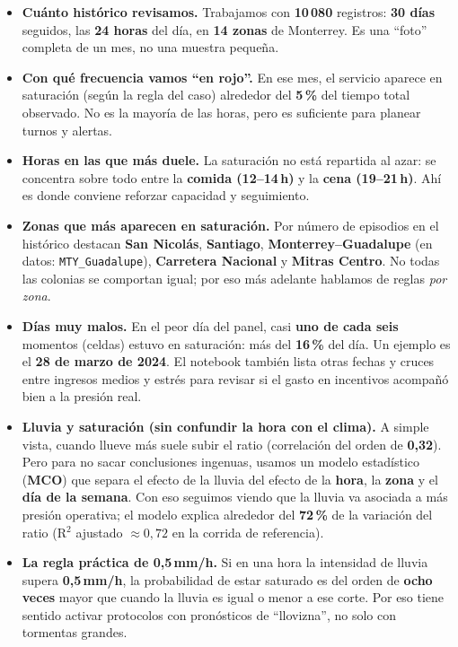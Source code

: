 \documentclass[11pt,a4paper]{article}
\begin{document}
\begin{itemize}
  \item \textbf{Cuánto histórico revisamos.} Trabajamos con \textbf{10\,080} registros: \textbf{30 días} seguidos, las \textbf{24 horas} del día, en \textbf{14 zonas} de Monterrey. Es una ``foto'' completa de un mes, no una muestra pequeña.

  \item \textbf{Con qué frecuencia vamos ``en rojo''.} En ese mes, el servicio aparece en saturación (según la regla del caso) alrededor del \textbf{5\,\%} del tiempo total observado. No es la mayoría de las horas, pero es suficiente para planear turnos y alertas.

  \item \textbf{Horas en las que más duele.} La saturación no está repartida al azar: se concentra sobre todo entre la \textbf{comida (12--14\,h)} y la \textbf{cena (19--21\,h)}. Ahí es donde conviene reforzar capacidad y seguimiento.

  \item \textbf{Zonas que más aparecen en saturación.} Por número de episodios en el histórico destacan \textbf{San Nicolás}, \textbf{Santiago}, \textbf{Monterrey--Guadalupe} (en datos: \texttt{MTY\_Guadalupe}), \textbf{Carretera Nacional} y \textbf{Mitras Centro}. No todas las colonias se comportan igual; por eso más adelante hablamos de reglas \emph{por zona}.

  \item \textbf{Días muy malos.} En el peor día del panel, casi \textbf{uno de cada seis} momentos (celdas) estuvo en saturación: más del \textbf{16\,\%} del día. Un ejemplo es el \textbf{28 de marzo de 2024}. El notebook también lista otras fechas y cruces entre ingresos medios y estrés para revisar si el gasto en incentivos acompañó bien a la presión real.

  \item \textbf{Lluvia y saturación (sin confundir la hora con el clima).} A simple vista, cuando llueve más suele subir el ratio (correlación del orden de \textbf{0{,}32}). Pero para no sacar conclusiones ingenuas, usamos un modelo estadístico (\textbf{MCO}) que separa el efecto de la lluvia del efecto de la \textbf{hora}, la \textbf{zona} y el \textbf{día de la semana}. Con eso seguimos viendo que la lluvia va asociada a más presión operativa; el modelo explica alrededor del \textbf{72\,\%} de la variación del ratio (R$^2$ ajustado $\approx 0{,}72$ en la corrida de referencia).

  \item \textbf{La regla práctica de 0{,}5\,mm/h.} Si en una hora la intensidad de lluvia supera \textbf{0{,}5\,mm/h}, la probabilidad de estar saturado es del orden de \textbf{ocho veces} mayor que cuando la lluvia es igual o menor a ese corte. Por eso tiene sentido activar protocolos con pronósticos de ``llovizna'', no solo con tormentas grandes.


\end{itemize}
\end{document}
